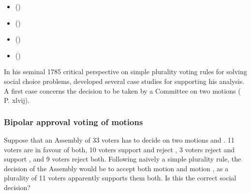 \documentclass[a4paper,12pt,english]{sphinxhowto}
\begin{document}
\begin{sphinxcontents}
\begin{itemize}
\item {} 
\sphinxAtStartPar
{}\label{\detokenize{pearls:id123}}{\hyperref[\detokenize{pearls:bipolar-approval-voting-of-motions}]{}} ()

\item {} 
\sphinxAtStartPar
{}\label{\detokenize{pearls:id124}}{\hyperref[\detokenize{pearls:who-wins-the-election}]{}} ()

\item {} 
\sphinxAtStartPar
{}\label{\detokenize{pearls:id125}}{\hyperref[\detokenize{pearls:resolving-circular-social-preferences}]{}} ()

\item {} 
\sphinxAtStartPar
{}\label{\detokenize{pearls:id126}}{\hyperref[\detokenize{pearls:the-borda-rank-analysis-method}]{}} ()

\end{itemize}
\end{sphinxcontents}

\sphinxAtStartPar
In his seminal 1785 critical perspective on simple plurality voting rules for solving social choice problems,  developed several case studies for supporting his analysis. A first case concerns the decision to be taken by a Committee on two motions ( P. xlvij).


\subsubsection{Bipolar approval voting of motions}
\label{\detokenize{pearls:bipolar-approval-voting-of-motions}}
\sphinxAtStartPar
Suppose that an Assembly of 33 voters has to decide on two motions  and . 11 voters are in favour of both, 10 voters support  and reject , 3 voters reject  and support , and 9 voters reject both. Following naively a simple plurality rule, the decision of the Assembly would be to accept both motion  and motion , as a plurality of 11 voters apparently supports them both. Is this the correct social decision?
\end{document}
